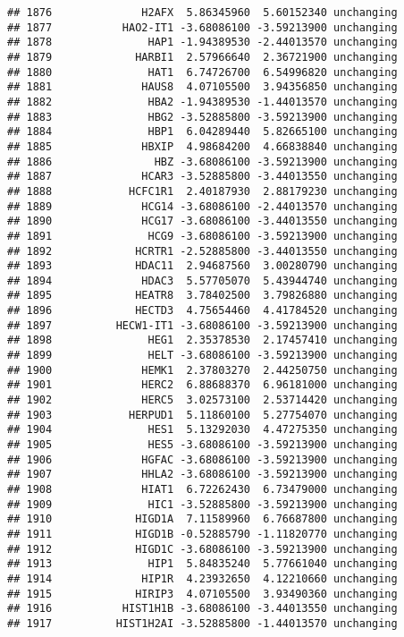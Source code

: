 \documentclass[]{article}
\begin{document}
\begin{verbatim}
## 1876              H2AFX  5.86345960  5.60152340 unchanging
## 1877           HAO2-IT1 -3.68086100 -3.59213900 unchanging
## 1878               HAP1 -1.94389530 -2.44013570 unchanging
## 1879             HARBI1  2.57966640  2.36721900 unchanging
## 1880               HAT1  6.74726700  6.54996820 unchanging
## 1881              HAUS8  4.07105500  3.94356850 unchanging
## 1882               HBA2 -1.94389530 -1.44013570 unchanging
## 1883               HBG2 -3.52885800 -3.59213900 unchanging
## 1884               HBP1  6.04289440  5.82665100 unchanging
## 1885              HBXIP  4.98684200  4.66838840 unchanging
## 1886                HBZ -3.68086100 -3.59213900 unchanging
## 1887              HCAR3 -3.52885800 -3.44013550 unchanging
## 1888            HCFC1R1  2.40187930  2.88179230 unchanging
## 1889              HCG14 -3.68086100 -2.44013570 unchanging
## 1890              HCG17 -3.68086100 -3.44013550 unchanging
## 1891               HCG9 -3.68086100 -3.59213900 unchanging
## 1892             HCRTR1 -2.52885800 -3.44013550 unchanging
## 1893             HDAC11  2.94687560  3.00280790 unchanging
## 1894              HDAC3  5.57705070  5.43944740 unchanging
## 1895             HEATR8  3.78402500  3.79826880 unchanging
## 1896             HECTD3  4.75654460  4.41784520 unchanging
## 1897          HECW1-IT1 -3.68086100 -3.59213900 unchanging
## 1898               HEG1  2.35378530  2.17457410 unchanging
## 1899               HELT -3.68086100 -3.59213900 unchanging
## 1900              HEMK1  2.37803270  2.44250750 unchanging
## 1901              HERC2  6.88688370  6.96181000 unchanging
## 1902              HERC5  3.02573100  2.53714420 unchanging
## 1903            HERPUD1  5.11860100  5.27754070 unchanging
## 1904               HES1  5.13292030  4.47275350 unchanging
## 1905               HES5 -3.68086100 -3.59213900 unchanging
## 1906              HGFAC -3.68086100 -3.59213900 unchanging
## 1907              HHLA2 -3.68086100 -3.59213900 unchanging
## 1908              HIAT1  6.72262430  6.73479000 unchanging
## 1909               HIC1 -3.52885800 -3.59213900 unchanging
## 1910             HIGD1A  7.11589960  6.76687800 unchanging
## 1911             HIGD1B -0.52885790 -1.11820770 unchanging
## 1912             HIGD1C -3.68086100 -3.59213900 unchanging
## 1913               HIP1  5.84835240  5.77661040 unchanging
## 1914              HIP1R  4.23932650  4.12210660 unchanging
## 1915             HIRIP3  4.07105500  3.93490360 unchanging
## 1916           HIST1H1B -3.68086100 -3.44013550 unchanging
## 1917          HIST1H2AI -3.52885800 -1.44013570 unchanging

\end{verbatim}
\end{document}
